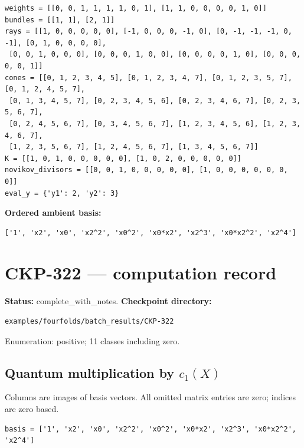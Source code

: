 \documentclass[10pt,a4paper]{article}
\begin{document}
\begin{lstlisting}
weights = [[0, 0, 1, 1, 1, 1, 0, 1], [1, 1, 0, 0, 0, 0, 1, 0]]
bundles = [[1, 1], [2, 1]]
rays = [[1, 0, 0, 0, 0, 0], [-1, 0, 0, 0, -1, 0], [0, -1, -1, -1, 0, -1], [0, 1, 0, 0, 0, 0],
 [0, 0, 1, 0, 0, 0], [0, 0, 0, 1, 0, 0], [0, 0, 0, 0, 1, 0], [0, 0, 0, 0, 0, 1]]
cones = [[0, 1, 2, 3, 4, 5], [0, 1, 2, 3, 4, 7], [0, 1, 2, 3, 5, 7], [0, 1, 2, 4, 5, 7],
 [0, 1, 3, 4, 5, 7], [0, 2, 3, 4, 5, 6], [0, 2, 3, 4, 6, 7], [0, 2, 3, 5, 6, 7],
 [0, 2, 4, 5, 6, 7], [0, 3, 4, 5, 6, 7], [1, 2, 3, 4, 5, 6], [1, 2, 3, 4, 6, 7],
 [1, 2, 3, 5, 6, 7], [1, 2, 4, 5, 6, 7], [1, 3, 4, 5, 6, 7]]
K = [[1, 0, 1, 0, 0, 0, 0, 0], [1, 0, 2, 0, 0, 0, 0, 0]]
novikov_divisors = [[0, 0, 1, 0, 0, 0, 0, 0], [1, 0, 0, 0, 0, 0, 0, 0]]
eval_y = {'y1': 2, 'y2': 3}
\end{lstlisting}

\textbf{Ordered ambient basis:}
\begin{lstlisting}
['1', 'x2', 'x0', 'x2^2', 'x0^2', 'x0*x2', 'x2^3', 'x0*x2^2', 'x2^4']
\end{lstlisting}

\clearpage\section*{CKP-322 --- computation record}
\textbf{Status:} complete\_with\_notes.
\textbf{Checkpoint directory:}
\begin{lstlisting}
examples/fourfolds/batch_results/CKP-322
\end{lstlisting}

Enumeration: positive; 11 classes including zero.
\subsection*{Quantum multiplication by $c_1(X)$}
Columns are images of basis vectors. All omitted matrix entries are zero; indices are zero based.

\begin{lstlisting}
basis = ['1', 'x2', 'x0', 'x2^2', 'x0^2', 'x0*x2', 'x2^3', 'x0*x2^2', 'x2^4']
\end{lstlisting}
\end{document}
